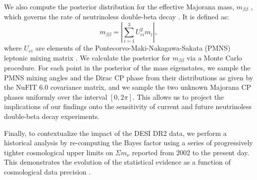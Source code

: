 \documentclass[]{article}
\begin{document}
We also compute the posterior distribution for the effective Majorana mass, $m_{\beta\beta}$ \citep{benato2015effectivemajoranamassneutrinoless}, which governs the rate of neutrinoless double-beta decay \citep{chakraborty2025highlypredictiveneutrinomodel}. It is defined as:
\begin{equation}m_{\beta\beta} = \left| \sum_{i=1}^{3} U_{ei}^2 m_i \right|,\end{equation}
where $U_{ei}$ are elements of the Pontecorvo-Maki-Nakagawa-Sakata (PMNS) leptonic mixing matrix \citep{savla2025classicalreconstructionpmnsmatrix}. We calculate the posterior for $m_{\beta\beta}$ via a Monte Carlo procedure. For each point in the posterior of the mass eigenstates, we sample the PMNS mixing angles and the Dirac CP phase from their distributions as given by the NuFIT 6.0 covariance matrix, and we sample the two unknown Majorana CP phases uniformly over the interval $[0, 2\pi]$. This allows us to project the implications of our findings onto the sensitivity of current and future neutrinoless double-beta decay experiments.

Finally, to contextualize the impact of the DESI DR2 data, we perform a historical analysis by re-computing the Bayes factor using a series of progressively tighter cosmological upper limits on $\Sigma m_\nu$ reported from 2002 to the present day. This demonstrates the evolution of the statistical evidence as a function of cosmological data precision \citep{ong2026bayesianviewdesidr2}.
\end{document}

